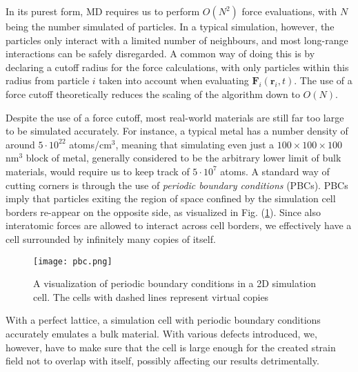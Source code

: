 In its purest form, MD requires us to perform $O(N^2)$ force evaluations, with $N$ being the number simulated of particles. 
In a typical simulation, however, the particles only interact with a limited number of neighbours, and most long-range interactions can be safely disregarded. 
A common way of doing this is by declaring a cutoff radius for the force calculations, with only particles within this radius from particle $i$ taken into account when evaluating $\mathbf{F}_i(\mathbf{r}_i,t)$. 
The use of a force cutoff theoretically reduces the scaling of the algorithm down to $O(N)$. \cite{verlet1967computer}

Despite the use of a force cutoff, most real-world materials are still far too large to be simulated accurately.
For instance, a typical metal has a number density of around $5\cdot 10^{22}$ atoms/cm$^3$, meaning that simulating even just a $100\times 100 \times 100$ nm$^3$ block of metal, generally considered to be the arbitrary lower limit of bulk materials, would require us to keep track of $5\cdot 10^7$ atoms.
A standard way of cutting corners is through the use of \textit{periodic boundary conditions} (PBCs). 
PBCs imply that particles exiting the region of space confined by the simulation cell borders re-appear on the opposite side, as visualized in Fig. (\ref{Fig:pbcs}). 
Since also interatomic forces are allowed to interact across cell borders, we effectively have a cell surrounded by infinitely many copies of itself.

\begin{figure}[!ht]
\center
\texttt{[image: pbc.png]}
\caption{A visualization of periodic boundary conditions in a 2D simulation cell. The cells with dashed lines represent virtual copies}
\label{Fig:pbcs}
\end{figure}

With a perfect lattice, a simulation cell with periodic boundary conditions accurately emulates a bulk material. 
With various defects introduced, we, however, have to make sure that the cell is large enough for the created strain field not to overlap with itself, possibly affecting our results detrimentally.

